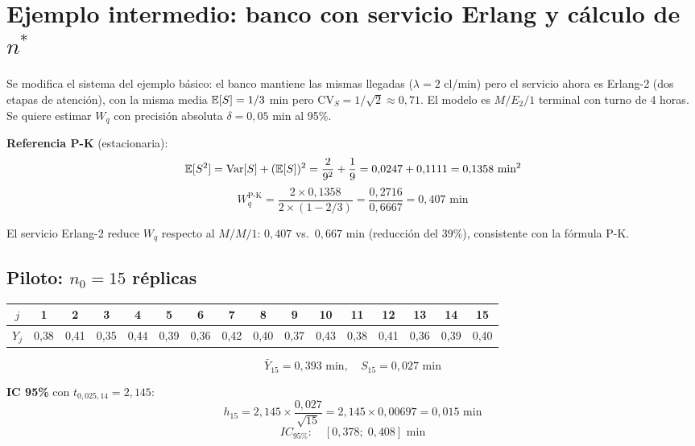 \documentclass[11pt, letterpaper]{article}
\begin{document}
\section{Ejemplo intermedio: banco con servicio Erlang y cálculo de $n^*$}

\begin{ejemplobox}[Sistema]
Se modifica el sistema del ejemplo básico: el banco mantiene las mismas llegadas ($\lambda=2$ cl/min) pero el servicio ahora es Erlang-2 (dos etapas de atención), con la misma media $\mathbb{E}[S]=1/3$ min pero $\text{CV}_S = 1/\sqrt{2} \approx 0{,}71$. El modelo es $M/E_2/1$ terminal con turno de 4 horas. Se quiere estimar $W_q$ con precisión absoluta $\delta = 0{,}05$ min al 95\%.
\end{ejemplobox}

\textbf{Referencia P-K} (estacionaria):
\[
\mathbb{E}[S^2] = \operatorname{Var}[S] + (\mathbb{E}[S])^2 = \frac{2}{9^2} + \frac{1}{9} = 0{,}0247 + 0{,}1111 = 0{,}1358 \text{ min}^2
\]
\[
W_q^{\text{P-K}} = \frac{2 \times 0{,}1358}{2 \times (1-2/3)} = \frac{0{,}2716}{0{,}6667} = 0{,}407 \text{ min}
\]

El servicio Erlang-2 reduce $W_q$ respecto al $M/M/1$: $0{,}407$ vs.\ $0{,}667$ min (reducción del 39\%), consistente con la fórmula P-K.

\subsection{Piloto: $n_0 = 15$ réplicas}

\begin{center}\small
\renewcommand{\arraystretch}{1.15}
\begin{tabular}{cccccccccccccccc}
\toprule
$j$ & 1 & 2 & 3 & 4 & 5 & 6 & 7 & 8 & 9 & 10 & 11 & 12 & 13 & 14 & 15 \\
\midrule
$Y_j$ & 0{,}38 & 0{,}41 & 0{,}35 & 0{,}44 & 0{,}39 & 0{,}36 & 0{,}42 & 0{,}40 & 0{,}37 & 0{,}43 & 0{,}38 & 0{,}41 & 0{,}36 & 0{,}39 & 0{,}40 \\
\bottomrule
\end{tabular}
\end{center}

\[
\bar Y_{15} = 0{,}393 \text{ min}, \quad S_{15} = 0{,}027 \text{ min}
\]

\textbf{IC 95\%} con $t_{0{,}025,14} = 2{,}145$:
\[
h_{15} = 2{,}145 \times \frac{0{,}027}{\sqrt{15}} = 2{,}145 \times 0{,}00697 = 0{,}015 \text{ min}
\]
\[
IC_{95\%}: \quad [0{,}378;\; 0{,}408] \text{ min}
\]
\end{document}
